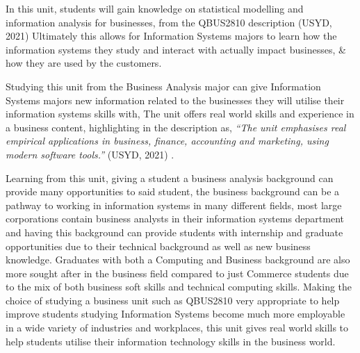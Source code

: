 In this unit, students will gain knowledge on statistical modelling and information analysis for businesses, from the QBUS2810 description  (USYD, 2021) Ultimately this allows for Information Systems majors to learn how the information systems they study and interact with actually impact businesses, & how they are used by the customers.

Studying this unit from the Business Analysis major can give Information Systems majors new information related to the businesses they will utilise their information systems skills with, The unit offers real world skills and experience in a business content, highlighting in the description as, \textit{“The unit emphasises real empirical applications in business, finance, accounting and marketing, using modern software tools.”} (USYD, 2021) .

Learning from this unit, giving a student a business analysis background can provide many opportunities to said student, the business background  can be a pathway to working in information systems in many different fields, most large corporations contain business analysts in their information systems department and having this background can provide students with internship and graduate opportunities due to their technical background as well as new business knowledge. Graduates with both a Computing and Business background are also more sought after in the business field compared to just Commerce students due to the mix of both business soft skills and technical computing skills. Making the choice of studying a business unit such as QBUS2810 very appropriate to help improve students studying Information Systems become much more employable in a wide variety of industries and workplaces, this unit gives real world skills to help students utilise their information technology skills in the business world.
